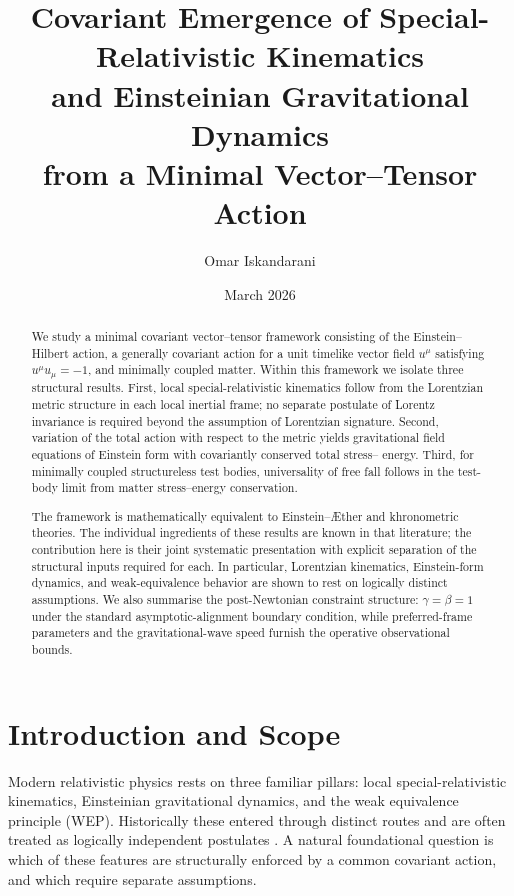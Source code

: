 \documentclass[12pt,a4paper]{article}
\title{Covariant Emergence of Special-Relativistic Kinematics\\
and Einsteinian Gravitational Dynamics\\
from a Minimal Vector--Tensor Action}
\author[1]{Omar Iskandarani}
\affil[1]{Independent Researcher, Groningen, The Netherlands\\
\texttt{info@omariskandarani.com}\quad ORCID: 0009-0006-1686-3961}
\date{March 2026}
\newcommand{\AEther}{\AE{}ther}
\begin{document}
    \maketitle
    
    \begin{abstract}
        We study a minimal covariant vector--tensor framework consisting of the
        Einstein--Hilbert action, a generally covariant action for a unit timelike
        vector field $u^{\mu}$ satisfying $u^{\mu}u_{\mu}=-1$, and minimally coupled
        matter. Within this framework we isolate three structural results. First,
        local special-relativistic kinematics follow from the Lorentzian metric
        structure in each local inertial frame; no separate postulate of Lorentz
        invariance is required beyond the assumption of Lorentzian signature. Second,
        variation of the total action with respect to the metric yields gravitational
        field equations of Einstein form with covariantly conserved total stress--
        energy. Third, for minimally coupled structureless test bodies, universality
        of free fall follows in the test-body limit from matter stress--energy
        conservation.
        
        The framework is mathematically equivalent to Einstein--\AEther{} and
        khronometric theories. The individual ingredients of these results are known in
        that literature; the contribution here is their joint systematic presentation
        with explicit separation of the structural inputs required for each. In
        particular, Lorentzian kinematics, Einstein-form dynamics, and weak-equivalence
        behavior are shown to rest on logically distinct assumptions. We also summarise
        the post-Newtonian constraint structure: $\gamma=\beta=1$ under the standard
        asymptotic-alignment boundary condition, while preferred-frame parameters and
        the gravitational-wave speed furnish the operative observational bounds.
    \end{abstract}
    
    \section{Introduction and Scope}
        \label{sec:intro}
        
        Modern relativistic physics rests on three familiar pillars: local
        special-relativistic kinematics, Einsteinian gravitational dynamics, and the
        weak equivalence principle (WEP). Historically these entered through distinct
        routes and are often treated as logically independent postulates
        \citep{einstein1905,einstein1915,will2014}. A natural foundational question is
        which of these features are structurally enforced by a common covariant action,
        and which require separate assumptions.
        
\end{document}
